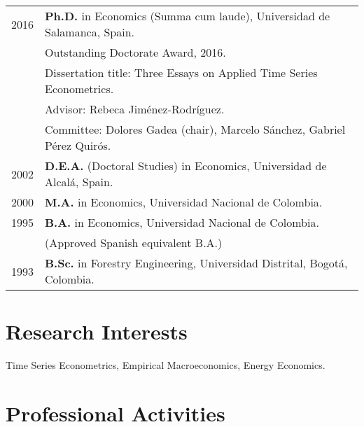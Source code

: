 \documentclass[11pt]{article}\usepackage[]{graphicx}\usepackage[]{color}
\begin{document}
\begin{tabular}{rl{-2cm}} %

2016 & \textbf{Ph.D.} in Economics (Summa cum laude), Universidad de Salamanca, Spain.\\
\vspace{1pt}& Outstanding Doctorate Award, 2016.\\
\vspace{1pt}& Dissertation title: Three Essays on Applied Time Series Econometrics.\\
\vspace{1pt}& Advisor: Rebeca Jiménez-Rodríguez.\\
\vspace{5pt}& Committee: Dolores Gadea (chair), Marcelo Sánchez, Gabriel Pérez Quirós.\\

\vspace{5pt}2002 & \textbf{D.E.A.} (Doctoral Studies) in Economics, Universidad de Alcalá, Spain.\\

\vspace{5pt}2000 & \textbf{M.A.} in Economics, Universidad Nacional de Colombia.\\

1995 & \textbf{B.A.} in Economics, Universidad Nacional de Colombia.\\
\vspace{5pt}& (Approved Spanish equivalent B.A.)\\

1993 & \textbf{B.Sc.} in Forestry Engineering, Universidad Distrital, Bogotá, Colombia.\\

\end{tabular}
\vspace{10pt}

\section{Research Interests}

Time Series Econometrics, Empirical Macroeconomics, Energy Economics.
\vspace{10pt}


\section{Professional Activities} 
\end{document}
